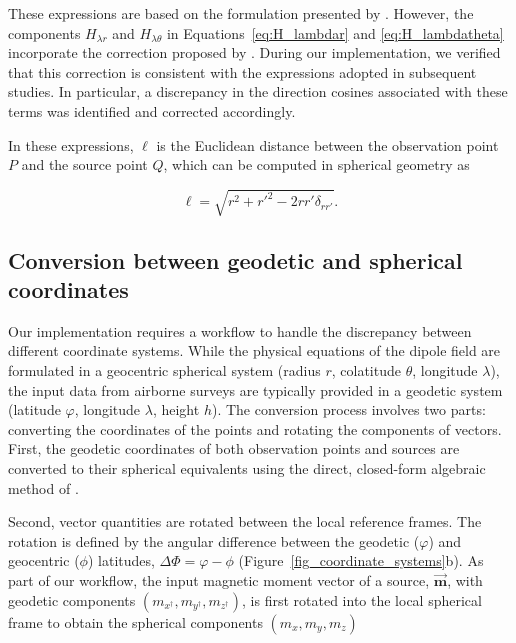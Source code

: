 \documentclass[a4paper,oneside,10pt]{book}
\begin{document}

These expressions are based on the formulation presented by \citet[see Table 5.2]{Langel1998}.
However, the components
$H_{\lambda r}$ and $H_{\lambda \theta}$ in Equations~\ref{eq:H_lambdar} and \ref{eq:H_lambdatheta}
incorporate the correction proposed by \citet{Dyment1998}.
During our implementation, we verified that
this correction is consistent with the expressions adopted in
subsequent studies. In particular, a discrepancy in the direction
cosines associated with these terms was identified and corrected
accordingly.

In these expressions, $\ell$ is the Euclidean distance between the observation point $P$ and the
source point $Q$, which can be computed in spherical geometry as

\begin{equation}
    \ell = \sqrt{r^2 + r'^2 - 2 r r' \delta_{rr'}}.
\end{equation}

\subsection{Conversion between geodetic and spherical coordinates}

Our implementation requires a workflow to handle the discrepancy between different coordinate
systems. While the physical equations of the dipole field are formulated in a geocentric spherical
system (radius $r$, colatitude $\theta$, longitude $\lambda$), the input data from airborne surveys
are typically provided in a geodetic system (latitude $\varphi$, longitude $\lambda$, height $h$).
The conversion process involves two parts: converting the coordinates of the points and rotating the
components of vectors. First, the geodetic coordinates of both observation points and sources are
converted to their spherical equivalents using the direct, closed-form algebraic method of \citet{Vermeille2002}.

Second, vector quantities are rotated between the local reference frames. The rotation is defined by
the angular difference between the geodetic ($\varphi$) and geocentric ($\phi$) latitudes,
$\Delta\Phi = \varphi - \phi$ (Figure~\ref{fig_coordinate_systems}b). As part of our workflow, the
input magnetic moment vector of a source, $\vec{\mathbf{m}}$, with geodetic components $(m_{x^{\dagger}}, m_{y^{\dagger}}, m_{z^{\dagger}})$,
is first rotated into the local spherical frame to obtain the spherical components $(m_x, m_y, m_z)$
\end{document}
